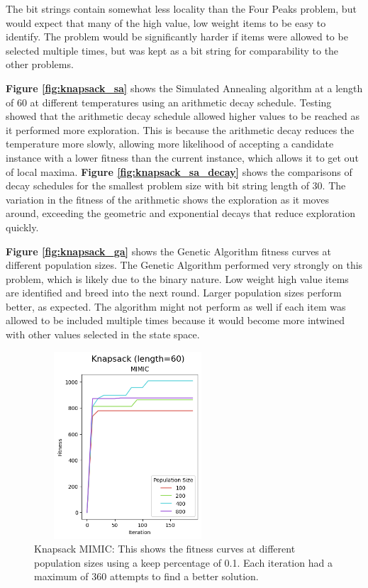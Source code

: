 \documentclass[letterpaper]{article} %
\begin{document}
The bit strings contain somewhat less locality than the Four Peaks problem, but would expect that many of the high value, low weight items to be easy to identify.  The problem would be significantly harder if items were allowed to be selected multiple times, but was kept as a bit string for comparability to the other problems.

\textbf{Figure \ref{fig:knapsack_sa}} shows the Simulated Annealing algorithm at a length of 60 at different temperatures using an arithmetic decay schedule.  Testing showed that the arithmetic decay schedule allowed higher values to be reached as it performed more exploration.  This is because the arithmetic decay reduces the temperature more slowly, allowing more likelihood of accepting a candidate instance with a lower fitness than the current instance, which allows it to get out of local maxima.  \textbf{Figure \ref{fig:knapsack_sa_decay}} shows the comparisons of decay schedules for the smallest problem size with bit string length of 30.  The variation in the fitness of the arithmetic shows the exploration as it moves around, exceeding the geometric and exponential decays that reduce exploration quickly.


\textbf{Figure \ref{fig:knapsack_ga}} shows the Genetic Algorithm fitness curves at different population sizes.  The Genetic Algorithm performed very strongly on this problem, which is likely due to the binary nature.  Low weight high value items are identified and breed into the next round.  Larger population sizes perform better, as expected.  The algorithm might not perform as well if each item was allowed to be included multiple times because it would become more intwined with other values selected in the state space.

\begin{figure}[!htb]
\centering
\includegraphics[width=2.75in, height=2.75in]{figures/Knapsack_length=60_MIMIC_l_60_ma_360_p_100__200__400__800_k_0.1_.png}
\caption{Knapsack MIMIC: This shows the fitness curves at different population sizes using a keep percentage of 0.1. Each iteration had a maximum of 360 attempts to find a better solution. }
\label{fig:knapsack_mimic}
\end{figure}
\end{document}

